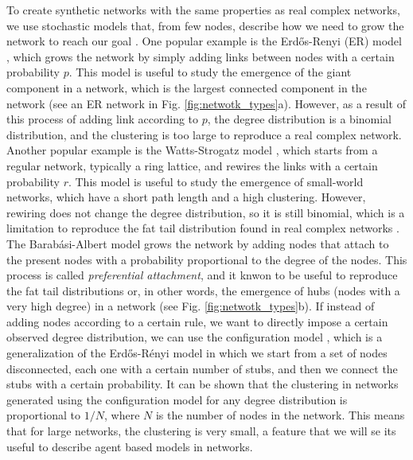 To create synthetic networks with the same properties as real complex networks, we use stochastic models that, from few nodes, describe how we need to grow the network to reach our goal \cite{posfai2016network}. One popular example is the Erd\H{o}s-Renyi (ER) model \cite{erdos1960evolution}, which grows the network by simply adding links between nodes with a certain probability $p$. This model is useful to study the emergence of the giant component in a network, which is the largest connected component in the network (see an ER network in Fig. \ref{fig:netwotk_types}a). However, as a result of this process of adding link according to $p$, the degree distribution is a binomial distribution, and the clustering is too large to reproduce a real complex network. Another popular example is the Watts-Strogatz model \cite{watts1998collective}, which starts from a regular network, typically a ring lattice, and rewires the links with a certain probability $r$. This model is useful to study the emergence of small-world networks, which have a short path length and a high clustering. However, rewiring does not change the degree distribution, so it is still binomial, which is a limitation to reproduce the fat tail distribution found in real complex networks \cite{newman2003structure}. The Barab\'asi-Albert model \cite{barabasi1999emergence} grows the network by adding nodes that attach to the present nodes with a probability proportional to the degree of the nodes. This process is called \textit{preferential attachment}, and it knwon to be useful to reproduce the fat tail distributions \cite{merton1968matthew} or, in other words, the emergence of hubs (nodes with a very high degree) in a network (see Fig. \ref{fig:netwotk_types}b). If instead of adding nodes according to a certain rule, we want to directly impose a certain observed degree distribution, we can use the configuration model \cite{newman-book}, which is a generalization of the Erd\H{o}s-R\'enyi model in which we start from a set of nodes disconnected, each one with a certain number of stubs, and then we connect the stubs with a certain probability. It can be shown that the clustering in networks generated using the configuration model for any degree distribution is proportional to $1/N$, where $N$ is the number of nodes in the network. This means that for large networks, the clustering is very small, a feature that we will se its useful to describe agent based models in networks.


